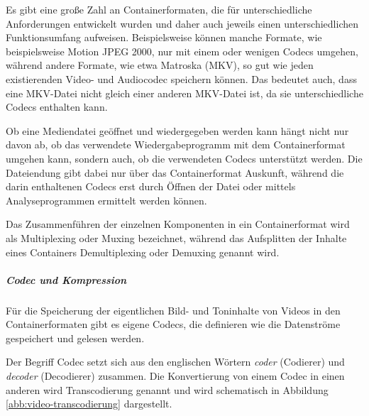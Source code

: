 Es gibt eine große Zahl an Containerformaten, die für unterschiedliche Anforderungen entwickelt wurden und daher auch jeweils einen unterschiedlichen Funktionsumfang aufweisen. Beispielsweise können manche Formate, wie beispielsweise Motion JPEG 2000, nur mit einem oder wenigen Codecs umgehen, während andere Formate, wie etwa Matroska (MKV), so gut wie jeden existierenden Video- und Audiocodec speichern können. Das bedeutet auch, dass eine MKV-Datei nicht gleich einer anderen MKV-Datei ist, da sie unterschiedliche Codecs enthalten kann. 

Ob eine Mediendatei geöffnet und wiedergegeben werden kann hängt nicht nur davon ab, ob das verwendete Wiedergabeprogramm mit dem Containerformat umgehen kann, sondern auch, ob die verwendeten Codecs unterstützt werden. Die Dateiendung gibt dabei nur über das Containerformat Auskunft, während die darin enthaltenen Codecs erst durch Öffnen der Datei oder mittels Analyseprogrammen ermittelt werden können.

Das Zusammenführen der einzelnen Komponenten in ein Containerformat wird als Multiplexing oder Muxing bezeichnet, während das Aufsplitten der Inhalte eines Containers Demultiplexing oder Demuxing genannt wird.

\label{video-codec}
\subparagraph{Codec und Kompression} Für die Speicherung der eigentlichen Bild- und Toninhalte von Videos in den Containerformaten gibt es eigene Codecs, die definieren wie die Datenströme gespeichert und gelesen werden. 

Der Begriff Codec setzt sich aus den englischen Wörtern \emph{coder} (Codierer) und \emph{decoder}  (Decodierer) zusammen. Die Konvertierung von einem Codec in einen anderen wird Transcodierung genannt und wird schematisch in Abbildung \ref{abb:video-transcodierung} dargestellt.

